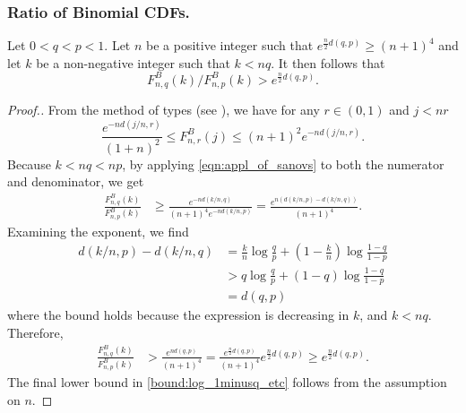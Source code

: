 \subsubsection{Ratio of Binomial CDFs.} \label{sec:ratio_of_bin_cdfs}
\begin{lemma} \label{lemma:ratio_of_cdfs}
	Let $0< q < p < 1$. Let $n$ be a positive integer such that $e^{\frac{n}{2} d(q,p)} \ge (n+1)^4$ and let $k$ be a non-negative integer such that $k < nq$. It then follows that
	\[
	F^B_{n,q}(k)/F^B_{n,p}(k) >  e^{\frac{n}{2} d(q,p)}.
	\]
\end{lemma}
\begin{proof}[Proof.]
	From the method of types  (see \cite{cover2012elements}), we have for any $r \in (0,1)$ and $j < nr$
	\begin{equation} \label{eqn:appl_of_sanovs}
	\frac{e^{-nd(j/n, r)}}{(1+n)^2}\le F^B_{n,r}(j) \le (n+1)^2 e^{- n d(j/n, r)}.
	\end{equation}
	Because $k < nq < np$, by applying \eqref{eqn:appl_of_sanovs} to both the numerator and denominator, we get
	\begin{align*}
	\frac{F^B_{n,q}(k)}{F^B_{n,p}(k)} & \ge  \frac{e^{-nd(k/n, q)}}{(n+1)^4 e^{- n d(k/n, p)}} = \frac{e^{n(d(k/n,p) - d(k/n,q))}}{(n+1)^4}.
	\end{align*}
	Examining the exponent, we find
	\begin{align*}
	d(k/n, p) - d(k/n,q) & = \frac{k}{n} \log \frac{q}{p} + \left(1-\frac{k}{n}\right)\log \frac{1-q}{1-p} \\
	& > q \log \frac{q}{p} + (1-q)\log \frac{1-q}{1-p} \\
	& = d(q,p)
	\end{align*}
	where the bound holds because the expression is decreasing in $k$, and $k < nq$. Therefore,
	\begin{align}
	\frac{F^B_{n,q}(k)}{F^B_{n,p}(k)} & > \frac{e^{n  d(q,p)}}{(n+1)^4} = \frac{e^{\frac{n}{2}d(q,p)}}{(n+1)^4} e^{\frac{n}{2}d(q,p)} \ge e^{\frac{n}{2}d(q,p)} \label{bound:log_1minusq_etc}.
	\end{align}
	The final lower bound in \eqref{bound:log_1minusq_etc} follows from the assumption on $n$.
\end{proof}

